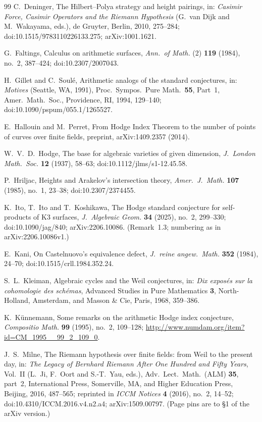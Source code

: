 \documentclass[11pt]{article}
\theoremstyle{definition}
\theoremstyle{remark}
\begin{document}
\begin{thebibliography}{99}
C.~Deninger,
The Hilbert--Polya strategy and height pairings,
in: \emph{Casimir Force, Casimir Operators and the Riemann Hypothesis}
(G.~van Dijk and M.~Wakayama, eds.), de Gruyter, Berlin, 2010, 275--284;
doi:10.1515/9783110226133.275; arXiv:1001.1621.

G.~Faltings,
Calculus on arithmetic surfaces,
\emph{Ann.\ of Math.} (2) \textbf{119} (1984), no.~2, 387--424;
doi:10.2307/2007043.

H.~Gillet and C.~Soul\'e,
Arithmetic analogs of the standard conjectures,
in: \emph{Motives} (Seattle, WA, 1991), Proc.\ Sympos.\ Pure Math.\ \textbf{55},
Part~1, Amer.\ Math.\ Soc., Providence, RI, 1994, 129--140;
doi:10.1090/pspum/055.1/1265527.

E.~Hallouin and M.~Perret,
From Hodge Index Theorem to the number of points of curves over finite fields,
preprint, arXiv:1409.2357 (2014).

W.~V.~D.~Hodge,
The base for algebraic varieties of given dimension,
\emph{J.\ London Math.\ Soc.} \textbf{12} (1937), 58--63;
doi:10.1112/jlms/s1-12.45.58.

P.~Hriljac,
Heights and Arakelov's intersection theory,
\emph{Amer.\ J.\ Math.} \textbf{107} (1985), no.~1, 23--38;
doi:10.2307/2374455.

K.~Ito, T.~Ito and T.~Koshikawa,
The Hodge standard conjecture for self-products of K3 surfaces,
\emph{J.\ Algebraic Geom.} \textbf{34} (2025), no.~2, 299--330;
doi:10.1090/jag/840; arXiv:2206.10086.
(Remark~1.3; numbering as in arXiv:2206.10086v1.)

E.~Kani,
On Castelnuovo's equivalence defect,
\emph{J.\ reine angew.\ Math.} \textbf{352} (1984), 24--70;
doi:10.1515/crll.1984.352.24.

S.~L.~Kleiman,
Algebraic cycles and the Weil conjectures,
in: \emph{Dix expos\'es sur la cohomologie des sch\'emas}, Advanced Studies in
Pure Mathematics \textbf{3}, North-Holland, Amsterdam, and Masson \& Cie,
Paris, 1968, 359--386.

K.~K\"unnemann,
Some remarks on the arithmetic Hodge index conjecture,
\emph{Compositio Math.} \textbf{99} (1995), no.~2, 109--128;
\url{http://www.numdam.org/item?id=CM_1995__99_2_109_0}.

J.~S.~Milne,
The Riemann hypothesis over finite fields: from Weil to the present day,
in: \emph{The Legacy of Bernhard Riemann After One Hundred and Fifty Years},
Vol.~II (L.~Ji, F.~Oort and S.-T.~Yau, eds.), Adv.\ Lect.\ Math.\ (ALM)
\textbf{35}, part~2, International Press, Somerville, MA, and Higher Education
Press, Beijing, 2016, 487--565; reprinted in \emph{ICCM Notices} \textbf{4}
(2016), no.~2, 14--52; doi:10.4310/ICCM.2016.v4.n2.a4; arXiv:1509.00797.
(Page pins are to \S1 of the arXiv version.)


\end{thebibliography}
\end{document}
